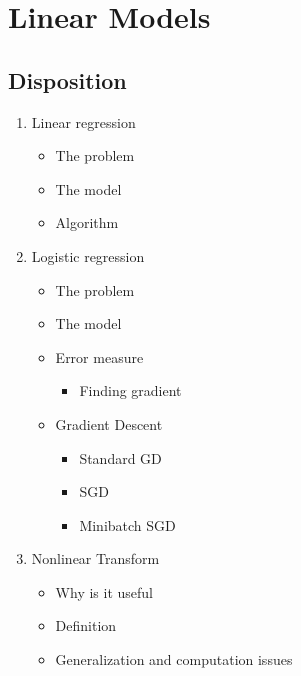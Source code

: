 \documentclass[a4, english]{article}
\author{Martin Nørskov Jensen}
\begin{document}
\maketitle

\newpage    
\tableofcontents
\newpage

\section{Linear Models}
\subsection{Disposition}
\begin{enumerate}
	\item Linear regression 
  \begin{itemize}
  	\item The problem
    \item The model
    \item Algorithm
  \end{itemize}
  \item Logistic regression
  \begin{itemize}
  	\item The problem 
    \item The model
    \item Error measure
    \begin{itemize}
    	\item Finding gradient
    \end{itemize}
    \item Gradient Descent
    \begin{itemize}
    	\item Standard GD
      \item SGD
      \item Minibatch SGD
    \end{itemize}
  \end{itemize}
  \item Nonlinear Transform
  \begin{itemize}
  	\item Why is it useful
    \item Definition 
    \item Generalization and computation issues
  \end{itemize}
\end{enumerate}
\newpage
\end{document}
